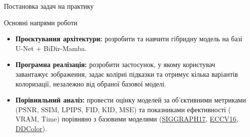 \begin{frame}{Постановка задач на практику}
    \begin{block}{Основні напрями роботи}
        \begin{itemize}
            \item \textbf{Проєктування архітектури:} розробити та навчити гібридну модель на базі U-Net + BiDir-Mamba.
            \item \textbf{Програмна реалізація:} розробити застосунок, у якому користувач завантажує зображення, задає колірні підказки та отримує кілька варіантів колоризації, незалежно від обраної базової моделі.
            \item \textbf{Порівняльний аналіз:} провести оцінку моделей за об'єктивними метриками ($\mathrm{PSNR}$, $\mathrm{SSIM}$, $\mathrm{LPIPS}$, $\mathrm{FID}$, $\mathrm{KID}$, $\mathrm{MSE}$) та показниками ефективності ($\mathrm{VRAM}$, $\mathrm{Time}$) порівняно з базовими моделями (\href{https://arxiv.org/pdf/1705.02999}{SIGGRAPH17}, \href{https://arxiv.org/pdf/1603.08511}{ECCV16}, \href{https://arxiv.org/pdf/2212.11613}{DDColor}).
        \end{itemize}
    \end{block}
\end{frame}